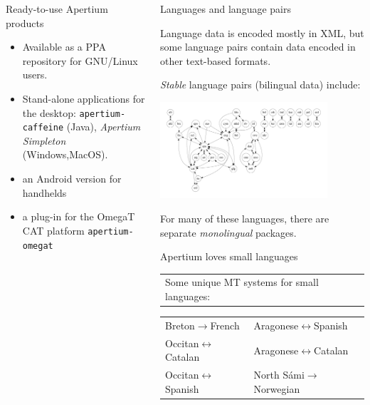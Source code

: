 \documentclass[final]{beamer} %
\newlength{\wideitemsep}
\let\olditem\item
\renewcommand{\item}{\setlength{\itemsep}{\wideitemsep}\olditem}
\begin{document}
\begin{frame}
\begin{columns}
\begin{column}{0.5\textwidth}
\begin{block}{Ready-to-use Apertium products}
\begin{itemize}\itemsep 0ex
  \item Available as a PPA repository for GNU/Linux users.
  \item Stand-alone applications for the desktop: \texttt{apertium-caffeine} (Java), \textit{Apertium Simpleton} (Windows,MacOS).
  \item an Android version for handhelds
  \item a plug-in for the OmegaT CAT platform \texttt{apertium-omegat}
\end{itemize}
\end{block}

\end{column}
\begin{column}{0.5\textwidth}

\begin{block}{Languages and language pairs}

Language data is encoded mostly in XML, but some language pairs contain data encoded in other text-based formats.

\emph{Stable} language pairs (bilingual data) include: 
\begin{center}
\includegraphics[width=0.82\textwidth]{Images/pairs.pdf}
\end{center}
For many of these languages, there are separate \textit{monolingual} packages.
\end{block}


\begin{block}{Apertium loves small languages}
\begin{tabular}{p{14cm}}
Some unique MT systems for small languages:
\end{tabular}
\begin{tabular}{ll}
Breton\(\to\)French & Aragonese\(\leftrightarrow\)Spanish \\
Occitan\(\leftrightarrow\)Catalan  & Aragonese\(\leftrightarrow\)Catalan \\
Occitan\(\leftrightarrow\)Spanish & North Sámi\(\to\)Norwegian \\
\end{tabular}
\end{block}






\end{column}
\end{columns}
\end{frame}
\end{document}
